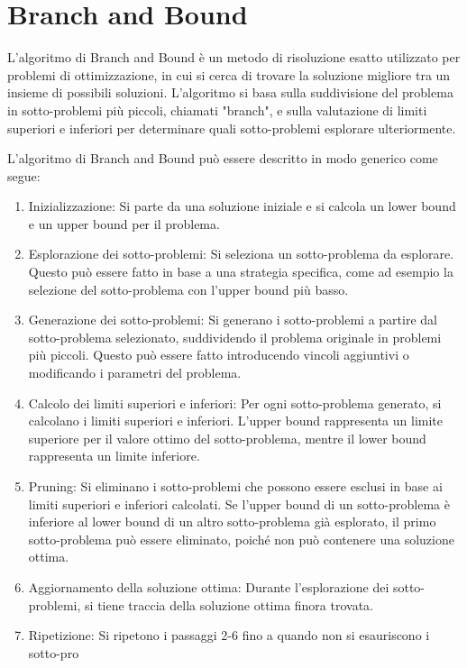 \chapter{Branch and Bound}

L'algoritmo di Branch and Bound è un metodo di risoluzione esatto utilizzato per problemi di ottimizzazione, in cui si cerca di trovare la soluzione migliore tra un insieme di possibili soluzioni. L'algoritmo si basa sulla suddivisione del problema in sotto-problemi più piccoli, chiamati "branch", e sulla valutazione di limiti superiori e inferiori per determinare quali sotto-problemi esplorare ulteriormente.

L'algoritmo di Branch and Bound può essere descritto in modo generico come segue:

\begin{enumerate}
\item Inizializzazione: Si parte da una soluzione iniziale e si calcola un lower bound e un upper bound per il problema.
\item Esplorazione dei sotto-problemi: Si seleziona un sotto-problema da esplorare. Questo può essere fatto in base a una strategia specifica, come ad esempio la selezione del sotto-problema con l'upper bound più basso.
\item Generazione dei sotto-problemi: Si generano i sotto-problemi a partire dal sotto-problema selezionato, suddividendo il problema originale in problemi più piccoli. Questo può essere fatto introducendo vincoli aggiuntivi o modificando i parametri del problema.
\item Calcolo dei limiti superiori e inferiori: Per ogni sotto-problema generato, si calcolano i limiti superiori e inferiori. L'upper bound rappresenta un limite superiore per il valore ottimo del sotto-problema, mentre il lower bound rappresenta un limite inferiore.
\item Pruning: Si eliminano i sotto-problemi che possono essere esclusi in base ai limiti superiori e inferiori calcolati. Se l'upper bound di un sotto-problema è inferiore al lower bound di un altro sotto-problema già esplorato, il primo sotto-problema può essere eliminato, poiché non può contenere una soluzione ottima.
\item Aggiornamento della soluzione ottima: Durante l'esplorazione dei sotto-problemi, si tiene traccia della soluzione ottima finora trovata.
\item Ripetizione: Si ripetono i passaggi 2-6 fino a quando non si esauriscono i sotto-pro
\end{enumerate}

